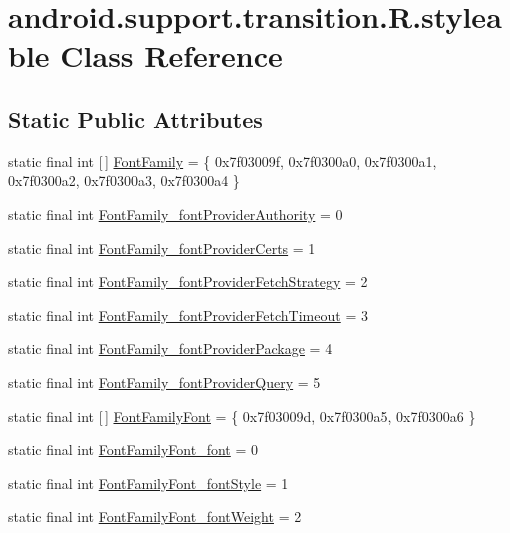 \hypertarget{classandroid_1_1support_1_1transition_1_1R_1_1styleable}{}\section{android.\+support.\+transition.\+R.\+styleable Class Reference}
\label{classandroid_1_1support_1_1transition_1_1R_1_1styleable}
\subsection*{Static Public Attributes}
\begin{DoxyCompactItemize}
\item 
static final int \mbox{[}$\,$\mbox{]} \mbox{\hyperlink{classandroid_1_1support_1_1transition_1_1R_1_1styleable_a7597f7b203cd6552f52ff451ef67a101}{Font\+Family}} = \{ 0x7f03009f, 0x7f0300a0, 0x7f0300a1, 0x7f0300a2, 0x7f0300a3, 0x7f0300a4 \}
\item 
static final int \mbox{\hyperlink{classandroid_1_1support_1_1transition_1_1R_1_1styleable_a5e4a75ec004885a8e02fd6765a7f2fb7}{Font\+Family\+\_\+font\+Provider\+Authority}} = 0
\item 
static final int \mbox{\hyperlink{classandroid_1_1support_1_1transition_1_1R_1_1styleable_a9570caeee4d31463c78df12b78492675}{Font\+Family\+\_\+font\+Provider\+Certs}} = 1
\item 
static final int \mbox{\hyperlink{classandroid_1_1support_1_1transition_1_1R_1_1styleable_a333c92f109c007831f8d61fe1c177259}{Font\+Family\+\_\+font\+Provider\+Fetch\+Strategy}} = 2
\item 
static final int \mbox{\hyperlink{classandroid_1_1support_1_1transition_1_1R_1_1styleable_a86713b50c4e5780f60ed2258828432b8}{Font\+Family\+\_\+font\+Provider\+Fetch\+Timeout}} = 3
\item 
static final int \mbox{\hyperlink{classandroid_1_1support_1_1transition_1_1R_1_1styleable_a9125e7a61176bb0e99dfb26a0fbba310}{Font\+Family\+\_\+font\+Provider\+Package}} = 4
\item 
static final int \mbox{\hyperlink{classandroid_1_1support_1_1transition_1_1R_1_1styleable_aa028215ae3a5d346664e17c1b9f65fac}{Font\+Family\+\_\+font\+Provider\+Query}} = 5
\item 
static final int \mbox{[}$\,$\mbox{]} \mbox{\hyperlink{classandroid_1_1support_1_1transition_1_1R_1_1styleable_aba5d65f84f0a65416b5f84ffdf9198ea}{Font\+Family\+Font}} = \{ 0x7f03009d, 0x7f0300a5, 0x7f0300a6 \}
\item 
static final int \mbox{\hyperlink{classandroid_1_1support_1_1transition_1_1R_1_1styleable_a406a736a8de29f76c14e9b08daeac820}{Font\+Family\+Font\+\_\+font}} = 0
\item 
static final int \mbox{\hyperlink{classandroid_1_1support_1_1transition_1_1R_1_1styleable_aa596a29b204cadfcf4894041bb877a46}{Font\+Family\+Font\+\_\+font\+Style}} = 1
\item 
static final int \mbox{\hyperlink{classandroid_1_1support_1_1transition_1_1R_1_1styleable_ac169fcd6c0a602cbbc9306606e16ab9a}{Font\+Family\+Font\+\_\+font\+Weight}} = 2
\end{DoxyCompactItemize}


